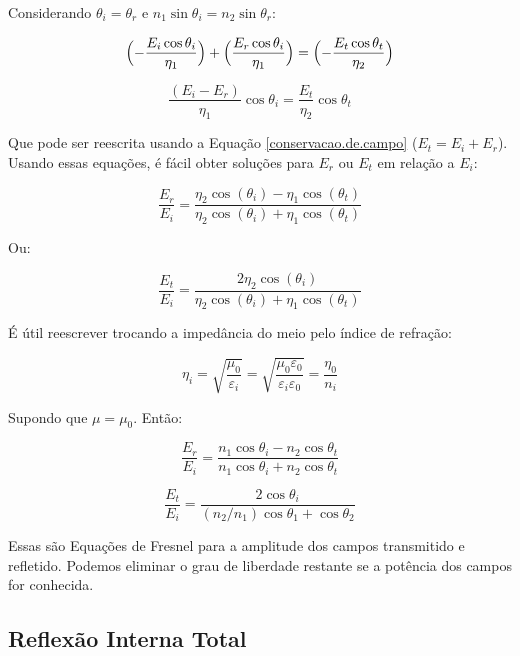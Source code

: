 \documentclass[12pt,a4paper]{report}
\begin{document}
Considerando $\theta_i=\theta_r$ e $n_1\sin\theta_i=n_2\sin\theta_r$:

\begin{equation*}
    \Bigl(-\frac{E_i\cos\theta_i}{\eta_1}\Bigr)+\Bigl(\frac{E_r\cos\theta_i}{\eta_1}\Bigr)=\Bigl(-\frac{E_t\cos\theta_t}{\eta_2}\Bigr)
\end{equation*}

\begin{equation*}
    \frac{(E_i-E_r)}{\eta_1}\cos\theta_i=\frac{E_t}{\eta_2}\cos\theta_t
\end{equation*}

Que pode ser reescrita usando a Equação \ref{conservacao.de.campo} ($E_t=E_i+E_r$). Usando essas equações, é fácil obter soluções para $E_r$ ou $E_t$ em relação a $E_i$:

\begin{equation*}
    \frac{E_r}{E_i}=\frac{\eta_2\cos(\theta_i)-\eta_1\cos(\theta_t)}{\eta_2\cos(\theta_i)+\eta_1\cos(\theta_t)}
\end{equation*}

Ou:

\begin{equation*}
    \frac{E_t}{E_i}=\frac{2\eta_2\cos(\theta_i)}{\eta_2\cos(\theta_i)+\eta_1\cos(\theta_t)}
\end{equation*}

É útil reescrever trocando a impedância do meio pelo índice de refração:

\begin{equation}
    \eta_i=\sqrt{\frac{\mu_0}{\varepsilon_i}}=\sqrt{\frac{\mu_0\varepsilon_0}{\varepsilon_i\varepsilon_0}}=\frac{\eta_0}{n_i}
\end{equation}

Supondo que $\mu=\mu_0$. Então:

\begin{equation}
    \frac{E_r}{E_i}=\frac{n_1\cos\theta_i-n_2\cos\theta_t}{n_1\cos\theta_i+n_2\cos\theta_t}
\end{equation}

\begin{equation}
    \frac{E_t}{E_i}=\frac{2\cos\theta_i}{(n_2/n_1)\cos\theta_1+\cos\theta_2}
\end{equation}

Essas são Equações de Fresnel para a amplitude dos campos transmitido e refletido. Podemos eliminar o grau de liberdade restante se a potência dos campos for conhecida.\pagebreak

\subsection{Reflexão Interna Total}
\end{document}
